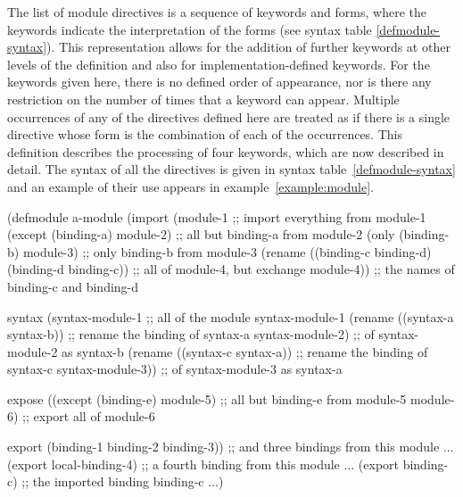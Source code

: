 \begin{optDefinition}
The list of module directives is a sequence of keywords and forms, where the
keywords indicate the interpretation of the forms (see syntax table
\ref{defmodule-syntax}). This representation allows for the addition of further
keywords at other levels of the definition and also for implementation-defined
keywords.  For the
keywords given here, there is no defined order of appearance, nor is there any
restriction on the number of times that a keyword can appear.  Multiple
occurrences of any of the directives defined here are treated as if there is a
single directive whose form is the combination of each of the occurrences.  This
definition describes the processing of four keywords, which are now described in
detail.  The syntax of all the directives is given in syntax
table~\ref{defmodule-syntax} and an example of their use appears in
example~\ref{example:module}.
%
\begin{figure*}[t]
\begin{example}
\label{example:module}
\begin{center}
\begin{minipage}[t]{\textwidth}{
\codeExample
(defmodule a-module
  (import
    (module-1                                        ;; import everything from module-1
     (except (binding-a) module-2)                   ;; all but binding-a from module-2
     (only (binding-b) module-3)                     ;; only binding-b from module-3
     (rename
      ((binding-c binding-d) (binding-d binding-c))  ;; all of module-4, but exchange
      module-4))                                     ;; the names of binding-c and binding-d

   syntax
    (syntax-module-1                                 ;; all of the module syntax-module-1
     (rename ((syntax-a syntax-b))                   ;; rename the binding of syntax-a
      syntax-module-2)                               ;; of syntax-module-2 as syntax-b
     (rename ((syntax-c syntax-a))                   ;; rename the binding of syntax-c
      syntax-module-3))                              ;; of syntax-module-3 as syntax-a

   expose
    ((except (binding-e) module-5)                   ;; all but binding-e from module-5
     module-6)                                       ;; export all of module-6

   export
    (binding-1 binding-2 binding-3))                 ;; and three bindings from this module
  ...
  (export local-binding-4)                           ;; a fourth binding from this module
  ...
  (export binding-c)                                 ;; the imported binding binding-c
  ...)
\endCodeExample
}
\end{minipage}
\end{center}
\end{example}
\end{figure*}
%
\end{optDefinition}
